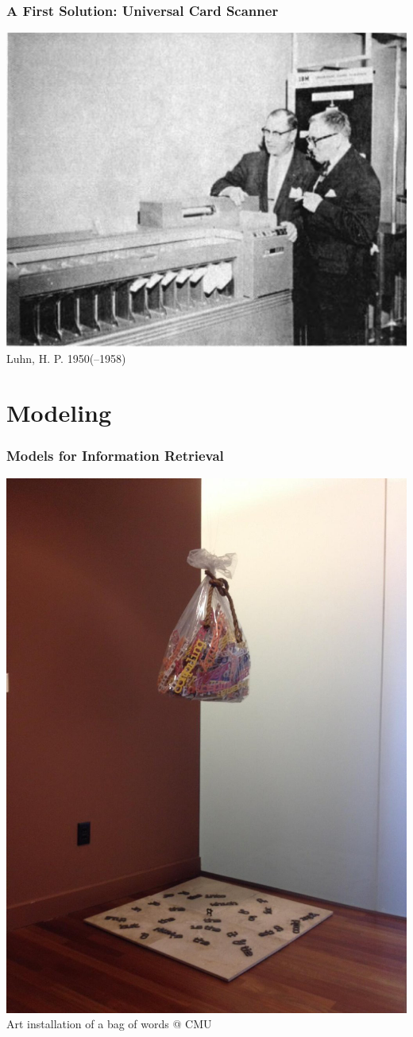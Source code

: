 \documentclass[svgnames]{beamer}
\begin{document}

\begin{frame}
  \frametitle{A First Solution: Universal Card Scanner }

  \begin{center}
    \includegraphics[width=.8\linewidth]{luhn}\\
    \raggedleft \footnotesize Luhn, H. P. 1950(--1958)
  \end{center}

\end{frame}


\section{Modeling}
\label{sec:modeling}

\newcommand{\ff}[1]{\visible<3-4>{\textcolor{Red}{#1}}}
\newcommand{\sw}[1]{\uncover<-3>{#1}}
\newcommand{\pl}{\hline\hline}
\newcommand{\vl}{\hfill\vline}

\begin{frame}
  \frametitle{Models for Information Retrieval}

  \begin{center}
    \includegraphics[width=.5\linewidth]{bag-of-words-sculpture}\\
    \raggedleft \footnotesize Art installation of a bag of words @ CMU  
  \end{center}
\end{frame}
\end{document}
